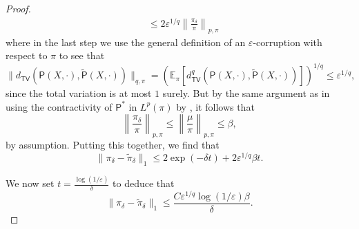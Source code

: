 \documentclass[10pt,a4paper]{amsart}
\begin{document}
\begin{proof}
\begin{align*}
        &\leq 2\varepsilon^{1/q}\left\|\frac{\pi_{\delta}}{\pi}\right\|_{p,\pi}
    \end{align*}
    where in the last step we use the general definition of an $\varepsilon$-corruption with respect to $\pi$ to see that
    \begin{equation*}
        \|d_{\mathsf{TV}}(\mathsf{P}(X,\cdot),\widetilde{\mathsf{P}}(X,\cdot))\|_{q,\pi}=\left(\mathbb{E}_{\pi}[d^q_{\mathsf{TV}}(\mathsf{P}(X,\cdot),\widetilde{\mathsf{P}}(X,\cdot))]\right)^{1/q}\leq \varepsilon^{1/q},
    \end{equation*}
    since the total variation is at most $1$ surely.
    But by the same argument as in  using the contractivity of $\mathsf{P}^*$ in $L^p(\pi)$ by , it follows that
    \begin{equation*}
        \left\|\frac{\pi_{\delta}}{\pi}\right\|_{p,\pi}\leq \left\|\frac{\mu}{\pi}\right\|_{p,\pi}\leq \beta,
    \end{equation*}
    by assumption. Putting this together, we find that
    \begin{equation*}
        \|\pi_{\delta}-\widetilde{\pi}_{\delta}\|_1\leq 2\exp(-\delta t)+2\varepsilon^{1/q} \beta t .
    \end{equation*}
    
    We now set $t=\frac{\log(1/\varepsilon)}{\delta}$ to deduce that 
    \begin{equation*}
        \|\pi_{\delta}-\widetilde{\pi}_{\delta}\|_1\leq \frac{C\varepsilon^{1/q}\log(1/\varepsilon)\beta}{\delta}.
    \end{equation*}

\end{proof}
\end{document}
